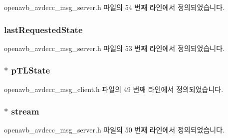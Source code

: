 openavb\+\_\+avdecc\+\_\+msg\+\_\+server.\+h 파일의 54 번째 라인에서 정의되었습니다.

\subsubsection[{\texorpdfstring{last\+Requested\+State}{lastRequestedState}}]{ last\+Requested\+State}\hypertarget{struct__avdecc__msg__state_ab772ed066355c575afa9a27c1d654c36}{}\label{struct__avdecc__msg__state_ab772ed066355c575afa9a27c1d654c36}


openavb\+\_\+avdecc\+\_\+msg\+\_\+server.\+h 파일의 53 번째 라인에서 정의되었습니다.

\subsubsection[{\texorpdfstring{p\+T\+L\+State}{pTLState}}]{$\ast$ p\+T\+L\+State}\hypertarget{struct__avdecc__msg__state_a442eb370b9ed2c74607fcaaecc9fef2a}{}\label{struct__avdecc__msg__state_a442eb370b9ed2c74607fcaaecc9fef2a}


openavb\+\_\+avdecc\+\_\+msg\+\_\+client.\+h 파일의 49 번째 라인에서 정의되었습니다.

\subsubsection[{\texorpdfstring{stream}{stream}}]{$\ast$ stream}\hypertarget{struct__avdecc__msg__state_a92c9ac28f244e59bcba3681be48f1c86}{}\label{struct__avdecc__msg__state_a92c9ac28f244e59bcba3681be48f1c86}


openavb\+\_\+avdecc\+\_\+msg\+\_\+server.\+h 파일의 50 번째 라인에서 정의되었습니다.

